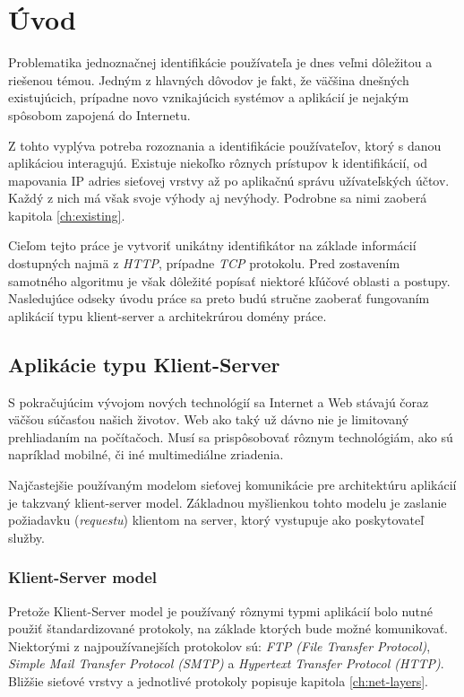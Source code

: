 \documentclass[
  digital, %
  table,   %
  lof,     %
  nolot,   %
  nocover
]{fithesis3}
\begin{document}
\chapter{Úvod}
Problematika jednoznačnej identifikácie používateľa je dnes veľmi
dôležitou a riešenou témou. Jedným z hlavných dôvodov je fakt, že väčšina
dnešných existujúcich, prípadne novo vznikajúcich systémov a aplikácií je
nejakým spôsobom zapojená do Internetu. 

Z tohto vyplýva potreba rozoznania a identifikácie používateľov, ktorý s
danou aplikáciou interagujú. Existuje niekoľko rôznych prístupov k 
identifikácií, od mapovania IP adries sieťovej vrstvy až po aplikačnú správu
užívateľských účtov. Každý z nich má však svoje výhody aj nevýhody. Podrobne sa nimi zaoberá kapitola \ref{ch:existing}.

Cieľom tejto práce je vytvoriť unikátny identifikátor na základe informácií
dostupných najmä z \textit{HTTP}, prípadne \textit{TCP} protokolu. Pred zostavením samotného algoritmu je
však dôležité popísať niektoré kľúčové oblasti a postupy.
Nasledujúce odseky úvodu práce sa preto budú stručne zaoberať fungovaním aplikácií typu
klient-server a architekrúrou domény práce. 

\section{Aplikácie typu Klient-Server}
S pokračujúcim vývojom nových technológií sa Internet a Web stávajú čoraz väčšou
súčasťou našich životov. Web ako taký už dávno nie je limitovaný prehliadaním na
počítačoch. Musí sa prispôsobovať rôznym technológiám, ako sú napríklad
mobilné, či iné multimediálne zriadenia.

Najčastejšie používaným modelom sieťovej komunikácie pre
architektúru aplikácií je takzvaný klient-server model. Základnou
myšlienkou tohto modelu je zaslanie požiadavku (\textit{requestu}) klientom na
server, ktorý vystupuje ako poskytovateľ služby.

\subsection{Klient-Server model}
Pretože Klient-Server model je používaný rôznymi typmi aplikácií bolo nutné
použiť štandardizované protokoly, na základe ktorých bude možné komunikovať.
Niektorými z najpoužívanejších protokolov sú: \textit{FTP (File Transfer Protocol)},
\textit{Simple Mail Transfer Protocol (SMTP)} a \textit{Hypertext Transfer
Protocol (HTTP)}. Bližšie sieťové vrstvy a jednotlivé protokoly popisuje
kapitola \ref{ch:net-layers}.
\end{document}

